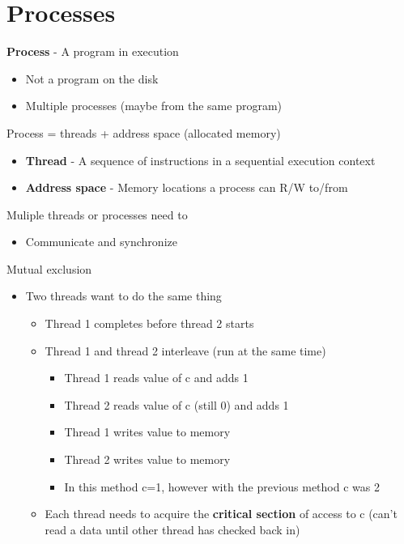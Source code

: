 \documentclass{article}[18pt]
\begin{document}
\section{Processes}
\textbf{Process} - A program in execution
\begin{itemize}
	\item Not a program on the disk
	\item Multiple processes (maybe from the same program)
\end{itemize}
Process = threads + address space (allocated memory)
\begin{itemize}
	\item \textbf{Thread} - A sequence of instructions in a sequential execution context
	\item \textbf{Address space} - Memory locations a process can R/W to/from
\end{itemize}
Muliple threads or processes need to
\begin{itemize}
	\item Communicate and synchronize
\end{itemize}
Mutual exclusion
\begin{itemize}
	\item Two threads want to do the same thing
	\begin{itemize}
		\item Thread 1 completes before thread 2 starts
		
		\item Thread 1 and thread 2 interleave (run at the same time)
		\begin{itemize}
			\item Thread 1 reads value of c and adds 1
			\item Thread 2 reads value of c (still 0) and adds 1
			\item Thread 1 writes value to memory
			\item Thread 2 writes value to memory
			\item In this method c=1, however with the previous method c was 2
		\end{itemize}
		\item Each thread needs to acquire the \textbf{critical section} of access to c (can't read a data until other thread has checked back in)
	\end{itemize}
\end{itemize}
\end{document}
